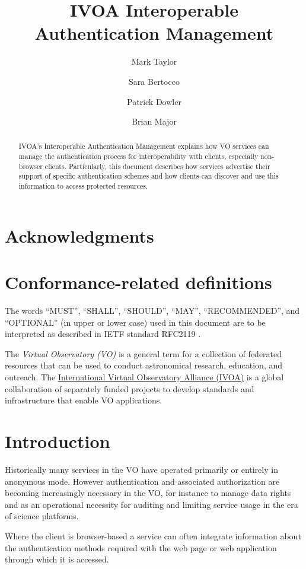 \documentclass[11pt,a4paper]{ivoa}
\title{IVOA Interoperable Authentication Management}
\author{Mark Taylor}
\author{Sara Bertocco}
\author{Patrick Dowler}
\author{Brian Major}
\begin{document}
\begin{abstract}
IVOA's Interoperable Authentication Management explains how
VO services can manage the authentication process for
interoperability with clients, especially non-browser clients.
Particularly, this document
describes how services advertise their
support of specific authentication schemes and how
clients can discover and use this information to access protected
resources.
\end{abstract}


\section*{Acknowledgments}


\section*{Conformance-related definitions}

The words ``MUST'', ``SHALL'', ``SHOULD'', ``MAY'', ``RECOMMENDED'', and
``OPTIONAL'' (in upper or lower case) used in this document are to be
interpreted as described in IETF standard RFC2119 \citep{std:RFC2119}.

The \emph{Virtual Observatory (VO)} is a
general term for a collection of federated resources that can be used
to conduct astronomical research, education, and outreach.
The \href{https://www.ivoa.net}{International
Virtual Observatory Alliance (IVOA)} is a global
collaboration of separately funded projects to develop standards and
infrastructure that enable VO applications.


\section{Introduction}\label{sec:intro}

Historically many services in the VO have operated primarily or
entirely in anonymous mode.
However authentication and associated authorization
are becoming increasingly necessary in the VO,
for instance to manage data rights and as an operational necessity for
auditing and limiting service usage in the era of science platforms.

Where the client is browser-based
a service can often integrate information about the authentication
methods required with the web page or web application through which
it is accessed.
\end{document}

